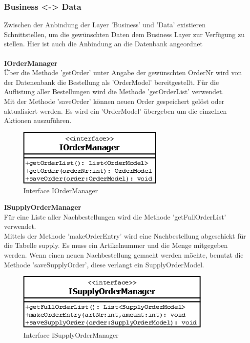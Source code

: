 
\subsubsection{Business <-> Data}

Zwischen der Anbindung der Layer 'Business' und 'Data' existieren Schnittstellen, um die gewünschten Daten dem Business Layer zur Verfügung zu stellen. Hier ist auch die Anbindung an die Datenbank angeordnet\\\\

\textbf{IOrderManager}\\
Über die Methode 'getOrder' unter Angabe der gewünschten OrderNr wird von der Datenenbank die Bestellung als 'OrderModel' bereitgestellt. Für die Auflistung aller Bestellungen wird die Methode 'getOrderList' verwendet.\\
Mit der Methode 'saveOrder' können neuen Order gespeichert gelöst oder aktualisiert werden. Es wird ein 'OrderModel' übergeben um die einzelnen Aktionen auszuführen. 
\begin{figure}[H]
	\includegraphics[width=0.3\linewidth]{Images/IOrderManager}
	\caption{Interface IOrderManager}
	\label{fig:if-IOrderManager}
\end{figure}


\textbf{ISupplyOrderManager}\\
Für eine Liste aller Nachbestellungen wird die Methode 'getFullOrderList' verwendet.\\
Mittels der Methode 'makeOrderEntry' wird eine Nachbestellung abgeschickt für die Tabelle supply. Es muss ein Artikelnummer und die Menge mitgegeben werden. Wenn einen neuen Nachbestellung gemacht werden möchte, benutzt die Methode 'saveSupplyOrder', diese verlangt ein SupplyOrderModel.
\begin{figure}[H]
	\includegraphics[width=0.6\linewidth]{Images/ISupplyOrderManager}
	\caption{Interface ISupplyOrderManager}
	\label{fig:if-ISupplyOrderManager}
\end{figure}



